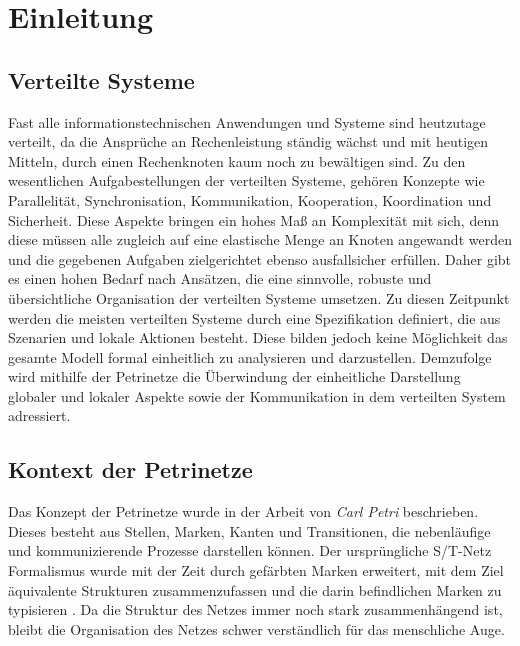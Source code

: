 \chapter{Einleitung}

\section{Verteilte Systeme}

	Fast alle informationstechnischen Anwendungen und Systeme sind heutzutage verteilt, da die Ansprüche an Rechenleistung ständig wächst und mit heutigen Mitteln, durch einen Rechenknoten kaum noch zu bewältigen sind. \bigbreak
	Zu den wesentlichen Aufgabestellungen der verteilten Systeme, gehören Konzepte wie Parallelität, Synchronisation, Kommunikation, Kooperation, Koordination und Sicherheit. Diese Aspekte bringen ein hohes Maß an Komplexität mit sich, denn diese müssen alle zugleich auf eine elastische Menge an Knoten angewandt werden und die gegebenen Aufgaben zielgerichtet ebenso ausfallsicher erfüllen. Daher gibt es einen hohen Bedarf nach Ansätzen, die eine sinnvolle, robuste und übersichtliche Organisation der verteilten Systeme umsetzen. \newline
	Zu diesen Zeitpunkt werden die meisten verteilten Systeme durch eine Spezifikation definiert, die aus Szenarien und lokale Aktionen besteht. Diese bilden jedoch keine Möglichkeit das gesamte Modell formal einheitlich zu analysieren und darzustellen. Demzufolge wird mithilfe der Petrinetze die Überwindung der einheitliche Darstellung globaler und lokaler Aspekte sowie der Kommunikation in dem verteilten System adressiert. \cite{ochsenschlager2013modellierung}

\section{Kontext der Petrinetze} \label{sec:KdP} 

	Das Konzept der Petrinetze wurde in der Arbeit von \textit{Carl Petri} beschrieben. Dieses besteht aus Stellen, Marken, Kanten und Transitionen, die nebenläufige und kommunizierende Prozesse darstellen können. Der ursprüngliche S/T-Netz Formalismus wurde mit der Zeit durch gefärbten Marken erweitert, mit dem Ziel äquivalente Strukturen zusammenzufassen und die darin befindlichen Marken zu typisieren \cite{kummerReferenznetze}. Da die Struktur des Netzes immer noch stark zusammenhängend ist, bleibt die Organisation des Netzes schwer verständlich für das menschliche Auge.\bigbreak

